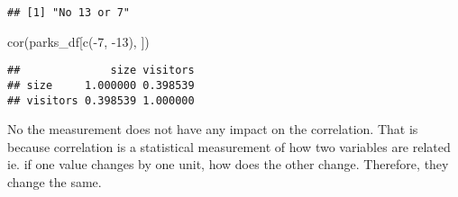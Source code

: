 \documentclass[
]{article}
\newenvironment{Shaded}{\begin{snugshade}}{\end{snugshade}}
\newcommand{\DecValTok}[1]{\textcolor[rgb]{0.00,0.00,0.81}{#1}}
\newcommand{\FunctionTok}[1]{\textcolor[rgb]{0.00,0.00,0.00}{#1}}
\newcommand{\NormalTok}[1]{#1}
\newcommand{\SpecialCharTok}[1]{\textcolor[rgb]{0.00,0.00,0.00}{#1}}
\begin{document}
\begin{verbatim}
## [1] "No 13 or 7"
\end{verbatim}

\begin{Shaded}
\begin{Highlighting}[]
\FunctionTok{cor}\NormalTok{(parks\_df[}\FunctionTok{c}\NormalTok{(}\SpecialCharTok{{-}}\DecValTok{7}\NormalTok{, }\SpecialCharTok{{-}}\DecValTok{13}\NormalTok{), ])}
\end{Highlighting}
\end{Shaded}

\begin{verbatim}
##              size visitors
## size     1.000000 0.398539
## visitors 0.398539 1.000000
\end{verbatim}

No the measurement does not have any impact on the correlation. That is
because correlation is a statistical measurement of how two variables
are related ie. if one value changes by one unit, how does the other
change. Therefore, they change the same.
\end{document}
